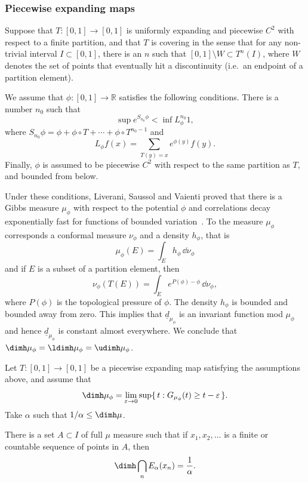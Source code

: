 \subsubsection{Piecewise expanding maps} \label{sec:piecewise}

Suppose that $T \colon [0,1] \to [0,1]$ is uniformly expanding and piecewise $C^2$ with respect to a finite partition, and that $T$ is covering in the sense that for any non-trivial interval $I \subset [0,1]$, there is an $n$ such that $[0,1] \setminus W \subset T^n (I)$, where $W$ denotes the set of points that eventually hit a discontinuity (i.e.\ an endpoint of a partition element).

We assume that $\phi \colon [0,1] \to \mathbb{R}$ satisfies the following conditions. There is a number $n_0$ such that
\[
\sup e^{S_{n_0} \phi} < \inf L_\phi^{n_0} 1,
\]
where $S_{n_0} \phi = \phi + \phi \circ T + \cdots + \phi \circ T^{n_0-1}$ and
\[
L_\phi f (x) = \sum_{T(y) = x} e^{\phi (y)} f(y).
\]
Finally, $\phi$ is assumed to be piecewise $C^2$ with respect to the same partition as $T$, and bounded from below.

Under these conditions, Liverani, Saussol and Vaienti proved that there is a Gibbs measure $\mu_\phi$ with respect to the potential $\phi$ and correlations decay exponentially fast for functions of bounded variation~\cite[Theorem~3.1]{liveranietal}. To the measure $\mu_\phi$ corresponds a conformal measure $\nu_\phi$ and a density $h_\phi$, that is
\[
\mu_\phi (E) = \int_E h_\phi \, \dd\nu_\phi
\]
and if $E$ is a subset of a partition element, then
\[
\nu_\phi (T(E)) = \int_E e^{P(\phi) - \phi} \, \dd \nu_\phi,
\]
where $P(\phi)$ is the topological pressure of $\phi$. The density $h_\phi$ is bounded and bounded away from zero. This implies that $\underline{d}_{\mu_\phi}$ is an invariant function mod $\mu_\phi$ and hence $\underline{d}_{\mu_\phi}$ is constant almost everywhere. We conclude that $\dimh \mu_\phi = \ldimh \mu_\phi = \udimh \mu_\phi$.

\begin{coro}\label{cor:piecewise}
Let $T \colon [0,1] \to [0,1]$ be a piecewise expanding map satisfying the assumptions above, and assume that
\begin{equation}\label{eq:dim-coarse}
\dimh \mu_\phi = \lim_{\varepsilon \to 0} \sup \{\, t : G_{\mu_\phi} (t) \geq t - \varepsilon \,\}.
\end{equation}
Take $\alpha$ such that $1/\alpha \leq \dimh \mu$.

There is a set $A \subset I$ of full $\mu$ measure such that if $x_1, x_2, \ldots$ is a finite or countable sequence of points in $A$, then
\[
\dimh \bigcap_n E_\alpha (x_n) = \frac{1}{\alpha}.
\]
\end{coro}

